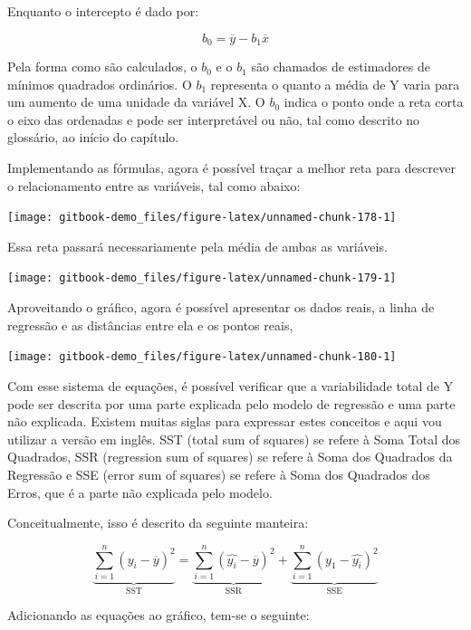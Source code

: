\documentclass[
]{book}
\begin{document}
Enquanto o intercepto é dado por:

\[b_0 = \overline{y} - b_1 \overline{x}\]

Pela forma como são calculados, o \(b_0\) e o \(b_1\) são chamados de
estimadores de mínimos quadrados ordinários. O \(b_1\) representa o
quanto a média de Y varia para um aumento de uma unidade da variável X.
O \(b_0\) indica o ponto onde a reta corta o eixo das ordenadas e pode
ser interpretável ou não, tal como descrito no glossário, ao início do
capítulo.

Implementando as fórmulas, agora é possível traçar a melhor reta para
descrever o relacionamento entre as variáveis, tal como abaixo:

\begin{center}\texttt{[image: gitbook-demo\_files/figure-latex/unnamed-chunk-178-1]} \end{center}

Essa reta passará necessariamente pela média de ambas as variáveis.

\begin{center}\texttt{[image: gitbook-demo\_files/figure-latex/unnamed-chunk-179-1]} \end{center}

Aproveitando o gráfico, agora é possível apresentar os dados reais, a
linha de regressão e as distâncias entre ela e os pontos reais,

\begin{center}\texttt{[image: gitbook-demo\_files/figure-latex/unnamed-chunk-180-1]} \end{center}

Com esse sistema de equações, é possível verificar que a variabilidade
total de Y pode ser descrita por uma parte explicada pelo modelo de
regressão e uma parte não explicada. Existem muitas siglas para
expressar estes conceitos e aqui vou utilizar a versão em inglês. SST
(total sum of squares) se refere à Soma Total dos Quadrados, SSR
(regression sum of squares) se refere à Soma dos Quadrados da Regressão
e SSE (error sum of squares) se refere à Soma dos Quadrados dos Erros,
que é a parte não explicada pelo modelo.

Conceitualmente, isso é descrito da seguinte manteira:

\[\underbrace{\sum\limits_{i=1}^{n} (y_i-\overline{y})^2}_\text{SST} = \underbrace{\sum\limits_{i=1}^{n} (\widehat{y_i}-\overline{y})^2}_\text{SSR} + \underbrace{\sum\limits_{i=1}^{n} (y_1-\widehat{y_i})^2}_\text{SSE}\]

Adicionando as equações ao gráfico, tem-se o seguinte:
\end{document}
